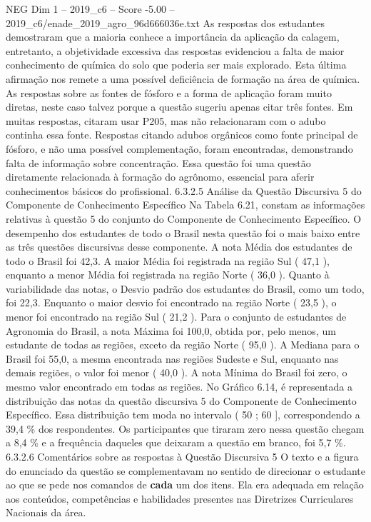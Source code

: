 \begin{textsample}{NEG Dim 1 – 2019\_c6 – Score -5.00 – 2019\_c6/enade\_2019\_agro\_96d666036e.txt}
As respostas dos estudantes demostraram que a maioria conhece a importância da aplicação da calagem, entretanto, a objetividade excessiva das respostas evidenciou a falta de maior conhecimento de química do solo que poderia ser mais explorado.
Esta última afirmação nos remete a uma possível deficiência de formação na área de química.
As respostas sobre as fontes de fósforo e a forma de aplicação foram muito diretas, neste caso talvez porque a questão sugeriu apenas citar três fontes.
Em muitas respostas, citaram usar P205, mas não relacionaram com o adubo continha essa fonte.
Respostas citando adubos orgânicos como fonte principal de fósforo, e não uma possível complementação, foram encontradas, demonstrando falta de informação sobre concentração.
Essa questão foi uma questão diretamente relacionada à formação do agrônomo, essencial para aferir conhecimentos básicos do profissional. 6.3.2.5 Análise da Questão Discursiva 5 do Componente de Conhecimento Específico Na Tabela 6.21, constam as informações relativas à questão 5 do conjunto do Componente de Conhecimento Específico.
O desempenho dos estudantes de todo o Brasil nesta questão foi o mais baixo entre as três questões discursivas desse componente.
A nota Média dos estudantes de todo o Brasil foi 42,3.
A maior Média foi registrada na região Sul ( 47,1 ), enquanto a menor Média foi registrada na região Norte ( 36,0 ).
Quanto à variabilidade das notas, o Desvio padrão dos estudantes do Brasil, como um todo, foi 22,3.
Enquanto o maior desvio foi encontrado na região Norte ( 23,5 ), o menor foi encontrado na região Sul ( 21,2 ).
Para o conjunto de estudantes de Agronomia do Brasil, a nota Máxima foi 100,0, obtida por, pelo menos, um estudante de todas as regiões, exceto da região Norte ( 95,0 ).
A Mediana para o Brasil foi 55,0, a mesma encontrada nas regiões Sudeste e Sul, enquanto nas demais regiões, o valor foi menor ( 40,0 ).
A nota Mínima do Brasil foi zero, o mesmo valor encontrado em todas as regiões.
No Gráfico 6.14, é representada a distribuição das notas da questão discursiva 5 do Componente de Conhecimento Específico.
Essa distribuição tem moda no intervalo ( 50 ; 60 ], correspondendo a 39,4 \% dos respondentes.
Os participantes que tiraram zero nessa questão chegam a 8,4 \% e a frequência daqueles que deixaram a questão em branco, foi 5,7 \%. 6.3.2.6 Comentários sobre as respostas à Questão Discursiva 5 O texto e a figura do enunciado da questão se complementavam no sentido de direcionar o estudante ao que se pede nos comandos de \textbf{cada} um dos itens.
Ela era adequada em relação aos conteúdos, competências e habilidades presentes nas Diretrizes Curriculares Nacionais da área.

\end{textsample}
